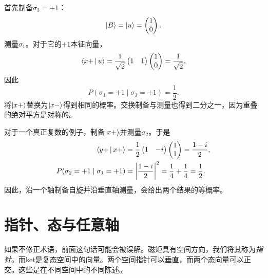 首先制备\(\sigma_3=+1\)：
\begin{equation}
  \left\lvert B\right\rangle=\left\lvert u\right\rangle=\begin{pmatrix}1\\0\end{pmatrix}.
\end{equation}
测量\(\sigma_1\)。对于它的\(+1\)本征向量，
\begin{equation}
  \left\langle x+\,\middle|\,u\right\rangle
  =
  \frac{1}{\sqrt2}
  \begin{pmatrix}1&1\end{pmatrix}
  \begin{pmatrix}1\\0\end{pmatrix}
  =\frac{1}{\sqrt2},
\end{equation}
因此
\begin{equation}
  P(\sigma_1=+1\mid\sigma_3=+1)=\frac12.
\end{equation}
将\(\left\lvert x+\right\rangle\)替换为\(\left\lvert x-\right\rangle\)得到相同的概率。交换制备与测量也得到二分之一，因为重叠的绝对平方是对称的。

对于一个真正复数的例子，制备\(\left\lvert x+\right\rangle\)并测量\(\sigma_2\)。于是
\begin{align}
  \left\langle y+\,\middle|\,x+\right\rangle
  &=
  \frac12
  \begin{pmatrix}1&-i\end{pmatrix}
  \begin{pmatrix}1\\1\end{pmatrix}
  =\frac{1-i}{2},
  \notag\\
  P(\sigma_2=+1\mid\sigma_1=+1)
  &=\left|\frac{1-i}{2}\right|^2
  =\frac14+\frac14
  =\frac12.
  \label{eq:l03-complex-probability-example}
\end{align}
因此，沿一个轴制备自旋并沿垂直轴测量，会给出两个结果的等概率。

\section{指针、态与任意轴}

如果不修正术语，前面这句话可能会被误解。磁矩具有空间方向，我们将其称为\emph{指针}。而ket是复态空间中的向量。两个空间指针可以垂直，而两个态向量可以正交。这些是在不同空间中的不同陈述。

\begin{classroomqa}
\end{classroomqa}

